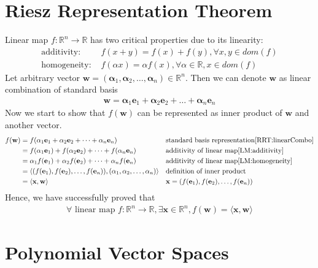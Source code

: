 \documentclass[11pt,a4paper]{report}
\begin{document}
\section{Riesz Representation Theorem}
\newcommand{\w}{\mathbf{w}}
\newcommand{\x}{\mathbf{x}}
\newcommand{\e}[1]{\mathbf{e}_{#1}}
\newcommand{\alp}[1]{\mathbf{\alpha}_{#1}}
\newcommand{\linearcombo}{\alp{1} \e{1} + \alp{2} \e{2} + \dots + \alp{n} \e{n}}
Linear map $f: \mathbb{R}^n \rightarrow \mathbb{R}$ has two critical properties due to its linearity: 
\begin{align}
    \text{additivity: }& f(x + y) = f(x) + f(y), \forall x, y \in dom(f)
    \label{LM:additivity} \\
    \text{homogeneity: }& f(\alpha x) = \alpha f(x), \forall \alpha \in
    \mathbb{R}, x \in dom(f) \label{LM:homogeneity}
\end{align}
Let arbitrary vector $\w = (\alp{1}, \alp{2}, \dots, \alp{n}) \in \mathbb{R}^{n}$.
Then we can denote $\w$ as linear combination of standard basis
\begin{align}
    \w = \linearcombo \label{RRT:linearCombo}
\end{align}
Now we start to show that $f(\w)$ can be represented as inner product of $\w$
and another vector.
\begin{align}
    f(\w) &= f(\linearcombo) 
    && \text{standard basis representation} \eqref{RRT:linearCombo} \\
    &= f(\alp{1} \e{1}) + f(\alp{2} \e{2}) + \dots + f(\alp{n} \e{n}) 
    && \text{additivity of linear map} \eqref{LM:additivity} \\
    &= \alp{1} f(\e{1}) + \alp{2} f(\e{2}) + \dots + \alp{n} f(\e{n})
    && \text{additivity of linear map} \eqref{LM:homogeneity} \\
    &= \langle(f(\e{1}), f(\e{2}), \dots, f(\e{n})), (\alp{1}, \alp{2}, \dots, \alp{n}) \rangle 
    && \text{definition of inner product} \\
    &= \langle \x, \w \rangle 
    && \x = (f(\e{1}), f(\e{2}), \dots, f(\e{n}))
\end{align}
Hence, we have successfully proved that 
\begin{align}
    \forall \text{ linear map } f:\mathbb{R}^n \rightarrow \mathbb{R}, \exists \x \in \mathbb{R}^n, f(\w) = \langle \x, \w \rangle
\end{align}

\newpage
\section{Polynomial Vector Spaces}
\end{document}
